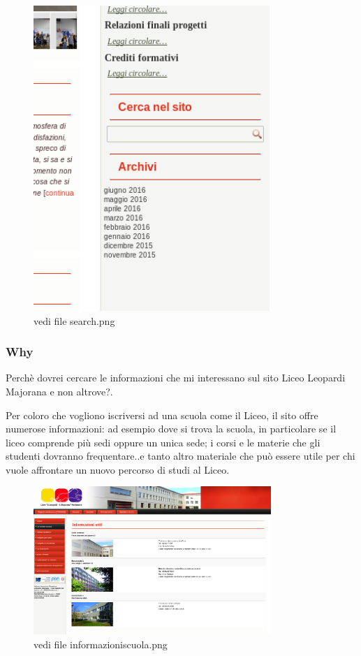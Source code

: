 \documentclass[12pt]{article}
\begin{document}
\begin{figure}[ht!]
\centering
\includegraphics[width=90mm]{search}
\caption{vedi file search.png}
\end{figure} 
\newpage
\subsubsection{Why} Perch\`e dovrei cercare le informazioni che mi interessano sul sito Liceo Leopardi Majorana e non altrove?. 

Per coloro che vogliono iscriversi ad una scuola come il Liceo, il sito offre numerose informazioni:
ad esempio dove si trova la scuola, in particolare se il liceo comprende pi\`u sedi oppure un unica sede; i corsi e le materie che gli studenti dovranno frequentare..e tanto altro materiale che pu\`o essere utile per chi vuole affrontare un nuovo percorso di studi al Liceo.

\begin{figure}[ht!]
\centering
\includegraphics[width=90mm]{informazioniscuola}
\caption{vedi file informazioniscuola.png}
\end{figure} 
\end{document}
